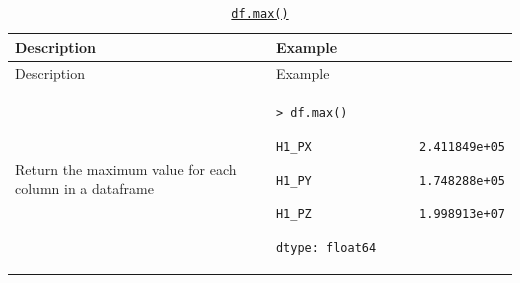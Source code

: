 \documentclass[10pt,a4paperpaper,]{article}
\begin{document}
\begin{longtable}[]{@{}ll@{}}
\caption{\href{http://pandas.pydata.org/pandas-docs/stable/generated/pandas.DataFrame.max.html}{\texttt{df.max()}}}\tabularnewline
\toprule
\begin{minipage}[b]{0.47\columnwidth}\raggedright\strut
Description
\strut\end{minipage} &
\begin{minipage}[b]{0.47\columnwidth}\raggedright\strut
Example
\strut\end{minipage}\tabularnewline
\midrule
\endfirsthead
\toprule
\begin{minipage}[b]{0.47\columnwidth}\raggedright\strut
Description
\strut\end{minipage} &
\begin{minipage}[b]{0.47\columnwidth}\raggedright\strut
Example
\strut\end{minipage}\tabularnewline
\midrule
\endhead
\begin{minipage}[t]{0.47\columnwidth}\raggedright\strut
Return the maximum value for each column in a dataframe
\strut\end{minipage} &
\begin{minipage}[t]{0.47\columnwidth}\raggedright\strut
\texttt{\textgreater{}\ df.max()}

\texttt{H1\_PX\ \ \ \ \ \ \ \ \ \ \ \ \ \ \ 2.411849e+05}

\texttt{H1\_PY\ \ \ \ \ \ \ \ \ \ \ \ \ \ \ 1.748288e+05}

\texttt{H1\_PZ\ \ \ \ \ \ \ \ \ \ \ \ \ \ \ 1.998913e+07}

\texttt{dtype:\ float64}
\strut\end{minipage}\tabularnewline
\bottomrule
\end{longtable}
\end{document}
